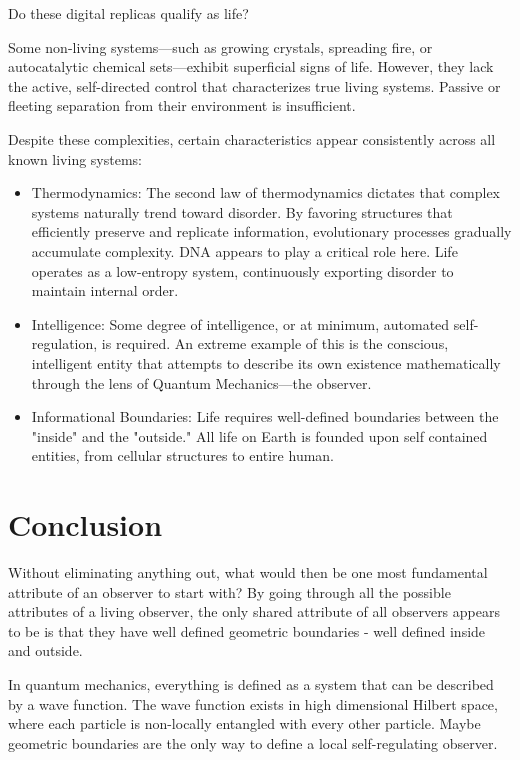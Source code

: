 Do these digital replicas qualify as life?

Some non-living systems—such as growing crystals, spreading fire, or autocatalytic chemical sets—exhibit superficial signs of life.
However, they lack the active, self-directed control that characterizes true living systems.
Passive or fleeting separation from their environment is insufficient.

Despite these complexities, certain characteristics appear consistently across all known living systems:

\begin{itemize}

\item Thermodynamics: The second law of thermodynamics dictates that complex systems naturally trend toward disorder.
  By favoring structures that efficiently preserve and replicate information, evolutionary processes gradually accumulate complexity.
  DNA appears to play a critical role here. Life operates as a low-entropy system, continuously exporting disorder to maintain internal order.

\item Intelligence: Some degree of intelligence, or at minimum, automated self-regulation, is required.
  An extreme example of this is the conscious, intelligent entity that attempts to describe its own existence mathematically through the lens of Quantum Mechanics—the observer. 

\item Informational Boundaries: Life requires well-defined boundaries between the "inside" and the "outside." All life on Earth is founded upon self contained entities, from cellular structures to entire human.

\end{itemize}


\section{Conclusion}

Without eliminating anything out, what would then be one most fundamental attribute of an observer to start with?
By going through all the possible attributes of a living observer, the only shared attribute of all observers appears to be is that they have well defined geometric boundaries - well defined inside and outside. 

In quantum mechanics, everything is defined as a system that can be described by a wave function. 
The wave function exists in high dimensional Hilbert space, where each particle is non-locally entangled with every other particle. 
Maybe geometric boundaries are the only way to define a local self-regulating observer.

